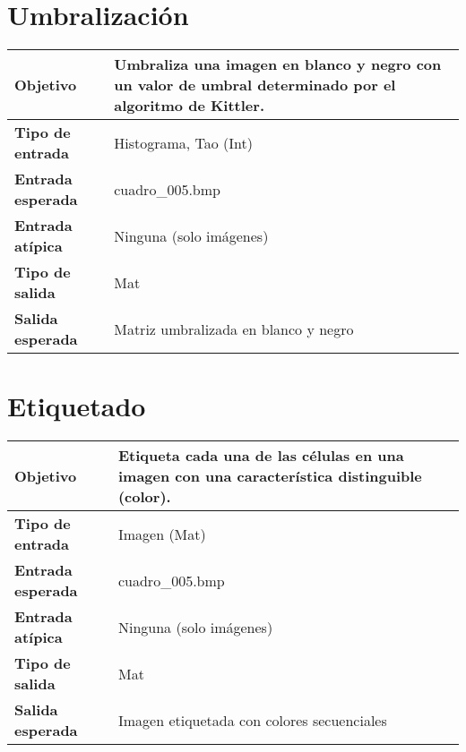 \documentclass{scrreprt}
\begin{document}
\section{Umbralización}

\vspace{0.3cm}
\begin{center}
    \begin{tabular}{|p{4.0cm}|p{9.0cm}|}
        \hline
	    \textbf{Objetivo} & Umbraliza una imagen en blanco y negro con un valor de umbral determinado por el algoritmo de Kittler.\\
        \hline
	    \textbf{Tipo de entrada} & Histograma, Tao (Int) \\
        \hline
	    \textbf{Entrada esperada} & cuadro_005.bmp \\
        \hline
	    \textbf{Entrada atípica} & Ninguna (solo imágenes) \\
        \hline
	    \textbf{Tipo de salida} & Mat \\
        \hline
	    \textbf{Salida esperada} & Matriz umbralizada en blanco y negro \\
        \hline        
    \end{tabular}
\end{center}


\section{Etiquetado}

\vspace{0.3cm}
\begin{center}
    \begin{tabular}{|p{4.0cm}|p{9.0cm}|}
        \hline
	    \textbf{Objetivo} & Etiqueta cada una de las células en una imagen con una característica distinguible (color). \\
        \hline
	    \textbf{Tipo de entrada} & Imagen (Mat) \\
        \hline
	    \textbf{Entrada esperada} & cuadro_005.bmp \\
        \hline
	    \textbf{Entrada atípica} & Ninguna (solo imágenes) \\
        \hline
	    \textbf{Tipo de salida} & Mat \\
        \hline
	    \textbf{Salida esperada} & Imagen etiquetada con colores secuenciales \\
        \hline        
    \end{tabular}
\end{center}
\end{document}
